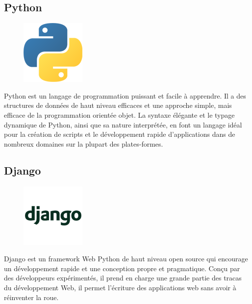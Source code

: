     \subsection{Python}
            \begin{figure}
                \vspace{-22pt}
              \begin{center}
                 \includegraphics[scale=0.36]{images/logo/python.png}
                 \label{fig74}
              \end{center}
              \vspace{-20pt}
              \vspace{-10pt}
            \end{figure}
        Python est un langage de programmation puissant et facile à apprendre. Il a des structures de données de haut niveau efficaces et une approche simple, mais efficace de la programmation orientée objet. La syntaxe élégante et le typage dynamique de Python, ainsi que sa nature interprétée, en font un langage idéal pour la création de scripts et le développement rapide d’applications dans de nombreux domaines sur la plupart des plates-formes\cite{17}.
        
    
    \subsection{Django}
            \begin{figure}
                \vspace{-22pt}
              \begin{center}
                 \includegraphics[scale=0.5]{images/logo/django.png}
                 \label{fig75}
              \end{center}
              \vspace{-20pt}
              \vspace{-10pt}
            \end{figure}
        Django est un framework Web Python de haut niveau open source qui encourage un développement rapide et une conception propre et pragmatique. Conçu par des développeurs expérimentés, il prend en charge une grande partie des tracas du développement Web, il permet l'écriture des applications web sans avoir à réinventer la roue\cite{18}.
        
